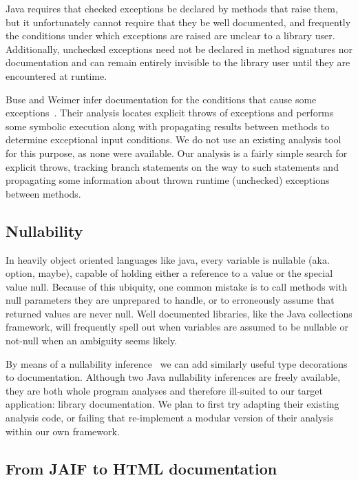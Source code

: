 Java requires that checked exceptions be declared by methods that raise them,
but it unfortunately cannot require that they be well documented, and
frequently the conditions under which exceptions are raised are unclear to a
library user. Additionally, unchecked exceptions need not be declared in method
signatures nor documentation and can remain entirely invisible to the library
user until they are encountered at runtime.

Buse and Weimer infer documentation for the conditions that cause some
exceptions~\cite{autodoc}.  Their analysis locates explicit throws of
exceptions and performs some symbolic execution along with propagating results
between methods to determine exceptional input conditions.  We do not use an
existing analysis tool for this purpose, as none were available.  Our analysis
is a fairly simple search for explicit throws, tracking branch statements on the
way to such statements and propagating some information about thrown runtime
(unchecked) exceptions between methods.

\subsection{Nullability}
\label{sec:Nullability}

In heavily object oriented languages like java, every variable is nullable
(aka. option, maybe), capable of holding either a reference to a value or the
special value null.  Because of this ubiquity, one common mistake is to call
methods with null parameters they are unprepared to handle, or to erroneously
assume that returned values are never null.  Well documented libraries, like
the Java collections framework, will frequently spell out when variables are
assumed to be nullable or not-null when an ambiguity seems likely.

By means of a nullability inference~\cite{NIT,NonNullTypeInference} we can add
similarly useful type decorations to documentation.  Although two Java
nullability inferences are freely available, they are both whole program
analyses and therefore ill-suited to our target application: library
documentation.  We plan to first try adapting their existing analysis code, or
failing that re-implement a modular version of their analysis within our own
framework.

\subsection{From JAIF to HTML documentation}
\label{sec:jaif2html}

